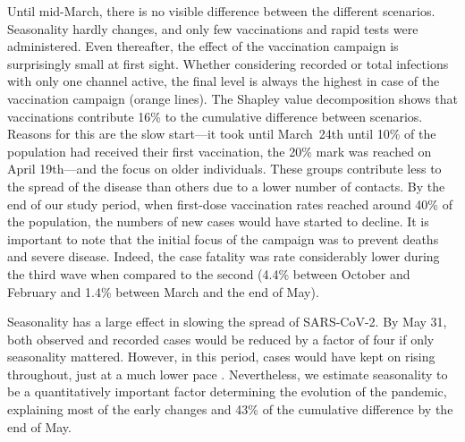 \begin{figure}[!tp]
\end{figure}

Until mid-March, there is no visible difference between the different scenarios.
Seasonality hardly changes, and only few vaccinations and rapid tests were administered.
Even thereafter, the effect of the vaccination campaign is surprisingly small at first
sight. Whether considering recorded or total infections with only one channel active,
the final level is always the highest in case of the vaccination campaign (orange
lines). The Shapley value decomposition shows that vaccinations contribute 16\% to the
cumulative difference between scenarios. Reasons for this are the slow start---it took
until March~24th until 10\% of the population had received their first vaccination, the
20\% mark was reached on April 19th---and the focus on older individuals. These groups
contribute less to the spread of the disease than others due to a lower number of
contacts.
By the end of our study period, when first-dose vaccination rates reached around 40\% of
the population, the numbers of new cases would have started to decline. It is important
to note that the initial focus of the campaign was to prevent deaths and severe disease.
Indeed, the case fatality was rate considerably lower during the third wave when compared
to the second (4.4\% between October and February and 1.4\% between March and the end of
May).

Seasonality has a large effect in slowing the spread of SARS-CoV-2. By May 31, both
observed and recorded cases would be reduced by a factor of four if only seasonality
mattered. However, in this period, cases would have kept on rising throughout, just at a
much lower pace \citep[this is in line with results in][, which our seasonality measure
is based on]{Gavenciak2021}. Nevertheless, we estimate seasonality to be a
quantitatively important factor determining the evolution of the pandemic, explaining
most of the early changes and 43\% of the cumulative difference by the end of May.

